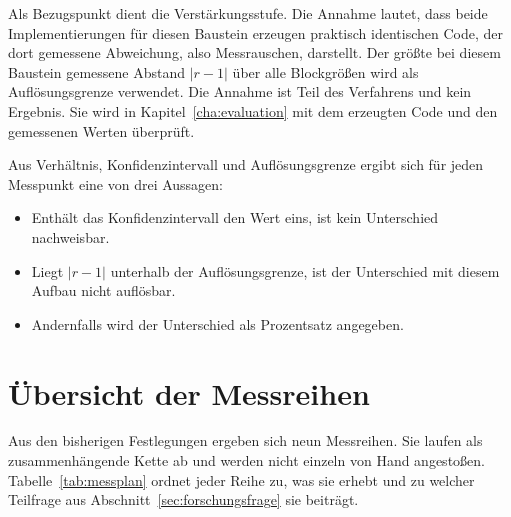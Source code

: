 Als Bezugspunkt dient die Verstärkungsstufe. Die Annahme lautet, dass beide
Implementierungen für diesen Baustein erzeugen praktisch identischen Code, der dort gemessene Abweichung, also Messrauschen, darstellt. Der größte bei diesem Baustein gemessene Abstand $|r - 1|$ über alle Blockgrößen wird als
Auflösungsgrenze verwendet. Die Annahme ist Teil des Verfahrens und kein
Ergebnis. Sie wird in Kapitel~\ref{cha:evaluation} mit dem erzeugten Code und den gemessenen Werten überprüft.

Aus Verhältnis, Konfidenzintervall und Auflösungsgrenze ergibt sich für jeden
Messpunkt eine von drei Aussagen:

\begin{itemize}
	\item Enthält das Konfidenzintervall den Wert eins, ist kein Unterschied
	nachweisbar.
	\item Liegt $|r - 1|$ unterhalb der Auflösungsgrenze, ist der Unterschied mit
	diesem Aufbau nicht auflösbar.
	\item Andernfalls wird der Unterschied als Prozentsatz angegeben.
\end{itemize}

\section{Übersicht der Messreihen}
\label{sec:messplan}

Aus den bisherigen Festlegungen ergeben sich neun Messreihen. Sie laufen als
zusammenhängende Kette ab und werden nicht einzeln von Hand angestoßen.
Tabelle~\ref{tab:messplan} ordnet jeder Reihe zu, was sie erhebt und zu
welcher Teilfrage aus Abschnitt~\ref{sec:forschungsfrage} sie beiträgt.

